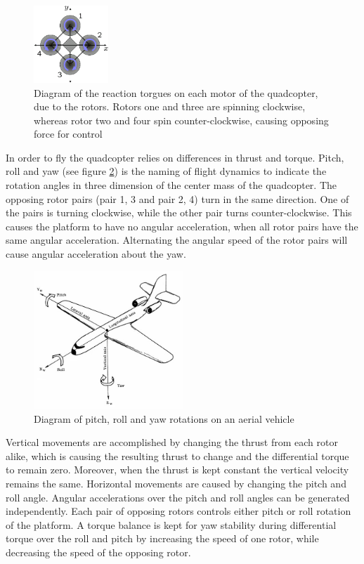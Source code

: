 \documentclass[a4paper]{article}
\begin{document}
\begin{figure}[!ht]
	\centering
	\includegraphics[width=0.25\textwidth]{images/quadcopter.png}
	\caption{Diagram of the reaction torgues on each motor of the quadcopter, due to the rotors. Rotors one and three are spinning clockwise, whereas rotor two and four spin counter-clockwise, causing opposing force for control}
	\label{quadcopter}
\end{figure}

In order to fly the quadcopter relies on differences in thrust and torque. Pitch, roll and yaw (see figure \ref{plane}) is the naming of flight dynamics to indicate the rotation angles in three dimension of the center mass of the quadcopter. The opposing rotor pairs (pair 1, 3 and pair 2, 4) turn in the same direction. One of the pairs is turning clockwise, while the other pair turns counter-clockwise. This causes the platform to have no angular acceleration, when all rotor pairs have the same angular acceleration. Alternating the angular speed of the rotor pairs will cause angular acceleration about the yaw.

\begin{figure}[!ht]
	\centering
	\includegraphics[width=0.5\textwidth]{images/plane.jpg}
	\caption{Diagram of pitch, roll and yaw rotations on an aerial vehicle}
	\label{plane}
\end{figure}

Vertical movements are accomplished by changing the thrust from each rotor alike, which is causing the resulting thrust to change and the differential torque to remain zero. Moreover, when the thrust is kept constant the vertical velocity remains the same. Horizontal movements are caused by changing the pitch and roll angle. Angular accelerations over the pitch and roll angles can be generated independently. Each pair of opposing rotors controls either pitch or roll rotation of the platform. A torque balance is kept for yaw stability during differential torque over the roll and pitch by increasing the speed of one rotor, while decreasing the speed of the opposing rotor.
\end{document}
